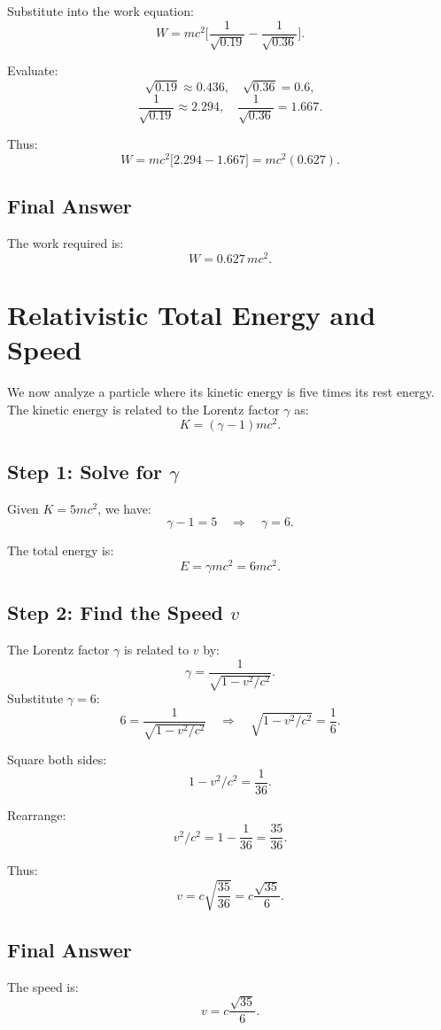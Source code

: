 \documentclass[a4paper,12pt]{article}
\begin{document}
\begin{multicols}{2}
Substitute into the work equation:
\[
W = mc^2 \Big[ \frac{1}{\sqrt{0.19}} - \frac{1}{\sqrt{0.36}} \Big].
\]

Evaluate:
\[
\sqrt{0.19} \approx 0.436, \quad \sqrt{0.36} = 0.6,
\]
\[
\frac{1}{\sqrt{0.19}} \approx 2.294, \quad \frac{1}{\sqrt{0.36}} = 1.667.
\]

Thus:
\[
W = mc^2 \Big[ 2.294 - 1.667 \Big] = mc^2 (0.627).
\]

\subsection*{Final Answer}
The work required is:
\[
W = 0.627 \, mc^2.
\]

\section{Relativistic Total Energy and Speed}
We now analyze a particle where its kinetic energy is five times its rest energy. The kinetic energy is related to the Lorentz factor \( \gamma \) as:
\[
K = (\gamma - 1)mc^2.
\]

\subsection*{Step 1: Solve for \( \gamma \)}
Given \( K = 5mc^2 \), we have:
\[
\gamma - 1 = 5 \quad \Rightarrow \quad \gamma = 6.
\]

The total energy is:
\[
E = \gamma mc^2 = 6mc^2.
\]

\subsection*{Step 2: Find the Speed \( v \)}
The Lorentz factor \( \gamma \) is related to \( v \) by:
\[
\gamma = \frac{1}{\sqrt{1 - v^2/c^2}}.
\]
Substitute \( \gamma = 6 \):
\[
6 = \frac{1}{\sqrt{1 - v^2/c^2}} \quad \Rightarrow \quad \sqrt{1 - v^2/c^2} = \frac{1}{6}.
\]

Square both sides:
\[
1 - v^2/c^2 = \frac{1}{36}.
\]

Rearrange:
\[
v^2/c^2 = 1 - \frac{1}{36} = \frac{35}{36}.
\]

Thus:
\[
v = c\sqrt{\frac{35}{36}} = c\frac{\sqrt{35}}{6}.
\]

\subsection*{Final Answer}
The speed is:
\[
v = c\frac{\sqrt{35}}{6}.
\]


\end{multicols}
\end{document}
